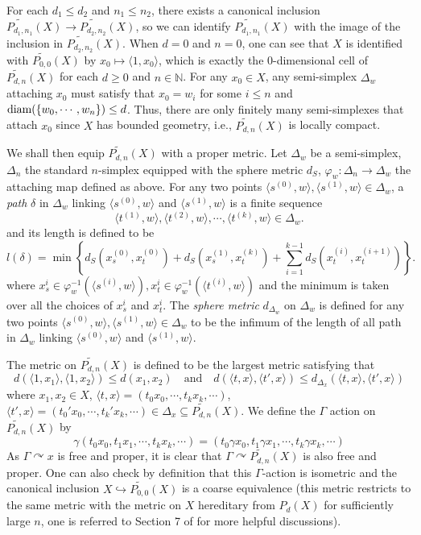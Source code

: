 \documentclass[11pt]{article}
\theoremstyle{definition}
\theoremstyle{plain}
\def\IN{\mathbb N}\def\IR{\mathbb R}\def\IE{\mathbb E}\def\IC{\mathbb C}\def\IL{\mathbb L}\def\IQ{\mathbb Q}\def\IA{\mathbb A}\def\IZ{\mathbb Z}
\def\MRdnX{\widetilde{P_{d,n}}(X)}
\def\diam{\textup{diam}}
\def\Ga{\Gamma}
\def\car{\curvearrowright}
\begin{document}
For each $d_1\leq d_2$ and $n_1\leq n_2$, there exists a canonical inclusion $\widetilde{P_{d_1,n_1}}(X)\to \widetilde{P_{d_2,n_2}}(X)$, so we can identify $\widetilde{P_{d_1,n_1}}(X)$ with the image of the inclusion in $\widetilde{P_{d_2,n_2}}(X)$. When $d=0$ and $n=0$, one can see that $X$ is identified with $\widetilde{P_{0,0}}(X)$ by $x_0\mapsto\langle 1,x_0\rangle$, which is exactly the 0-dimensional cell of $\MRdnX$ for each $d\geq 0$ and $n\in\IN$. For any $x_0\in X$, any semi-simplex $\Delta_w$ attaching $x_0$ must satisfy that $x_0=w_i$ for some $i\leq n$ and $\diam(\{w_0,\cdots,w_n\})\leq d$. Thus, there are only finitely many semi-simplexes that attach $x_0$ since $X$ has bounded geometry, i.e., $\MRdnX$ is locally compact.

We shall then equip $\MRdnX$ with a proper metric. Let $\Delta_w$ be a semi-simplex, $\Delta_n$ the standard $n$-simplex equipped with the sphere metric $d_S$, $\varphi_w:\Delta_n\to \Delta_w$ the attaching map defined as above. For any two points $\langle s^{(0)},w\rangle,\langle s^{(1)},w\rangle\in\Delta_w$, a \emph{path} $\delta$ in $\Delta_w$ linking $\langle s^{(0)},w\rangle$ and $\langle s^{(1)},w\rangle$ is a finite sequence
$$\langle t^{(1)},w\rangle,\langle t^{(2)},w\rangle,\cdots,\langle t^{(k)},w\rangle\in\Delta_w.$$
and its length is defined to be
$$l(\delta)=\min\left\{d_S(x_s^{(0)},x_t^{(0)})+d_S(x_s^{(1)},x_t^{(k)})+\sum_{i=1}^{k-1}d_S(x_t^{(i)},x_t^{(i+1)})\right\}.$$
where $x_s^{i}\in\varphi^{-1}_w(\langle s^{(i)},w\rangle),x_t^{i}\in\varphi^{-1}_w(\langle t^{(i)},w\rangle)$ and the minimum is taken over all the choices of $x_s^{i}$ and $x_t^{i}$. The \emph{sphere metric} $d_{\Delta_w}$ on $\Delta_w$ is defined for any two points $\langle s^{(0)},w\rangle,\langle s^{(1)},w\rangle\in\Delta_w$ to be the infimum of the length of all path in $\Delta_w$ linking $\langle s^{(0)},w\rangle$ and $\langle s^{(1)},w\rangle$.

The metric on $\MRdnX$ is defined to be the largest metric satisfying that
$$d(\langle 1,x_1\rangle,\langle1,x_2\rangle)\leq d(x_1,x_2)\quad\text{and}\quad d(\langle t,x\rangle,\langle t',x\rangle)\leq d_{\Delta_x}(\langle t,x\rangle,\langle t',x\rangle)$$
where $x_1,x_2\in X$, $\langle t,x\rangle=(t_0x_0,\cdots,t_kx_k,\cdots)$, $\langle t' ,x\rangle=(t_0'x_0,\cdots,t_k'x_k,\cdots)\in\Delta_x\subseteq \MRdnX$. We define the $\Ga$ action on $\MRdnX$ by
$$\gamma(t_0x_0,t_1x_1,\cdots,t_kx_k,\cdots)=(t_0\gamma x_0,t_1\gamma x_1,\cdots,t_k\gamma x_k,\cdots)$$
As $\Ga\car x$ is free and proper, it is clear that $\Ga\car\MRdnX$ is also free and proper. One can also check by definition that this $\Ga$-action is isometric and the canonical inclusion $X\hookrightarrow\widetilde{P_{0,0}}(X)$ is a coarse equivalence (this metric restricts to the same metric with the metric on $X$ hereditary from $P_d(X)$ for sufficiently large $n$, one is referred to Section 7 of \cite{HIT2020} for more helpful discussions).
\end{document}
